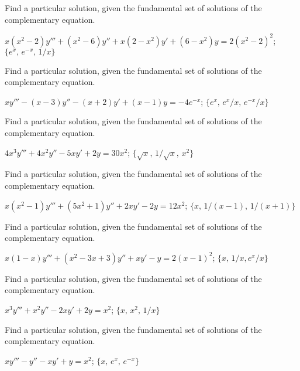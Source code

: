 \documentclass{ximera}
\begin{document}
\begin{problem}\label{exer:9.4.6}
Find a particular
solution, given the fundamental set of solutions of the complementary equation.

$x(x^2-2)y'''+(x^2-6)y''+x(2-x^2)y'+(6-x^2)y=2(x^2-2)^2$; \quad
 $\{e^x,\,e^{-x},\,1/x\}$
\end{problem}

\begin{problem}\label{exer:9.4.7}
Find a particular
solution, given the fundamental set of solutions of the complementary equation.

$xy'''-(x-3)y''-(x+2)y'+(x-1)y=-4e^{-x}$; \quad
$\{e^x,\,e^x/x,\,e^{-x}/x\}$
\end{problem}

\begin{problem}\label{exer:9.4.8}
Find a particular
solution, given the fundamental set of solutions of the complementary equation.

$4x^3y'''+4x^2y''-5xy'+2y=30x^2$; \quad  $\{\sqrt x,\,1/\sqrt x,\,x^2\}$
\end{problem}

\begin{problem}\label{exer:9.4.9}
Find a particular
solution, given the fundamental set of solutions of the complementary equation.

$x(x^2-1)y'''+(5x^2+1)y''+2xy'-2y=12x^2$; \quad
$\{x,\,1/(x-1),\,1/(x+1)\}$
\end{problem}

\begin{problem}\label{exer:9.4.10}
Find a particular
solution, given the fundamental set of solutions of the complementary equation.

$x(1-x)y'''+(x^2-3x+3)y''+xy'-y=2(x-1)^2$; \quad
$\{x,\,1/x,e^x/x\}$
\end{problem}

\begin{problem}\label{exer:9.4.11}
Find a particular
solution, given the fundamental set of solutions of the complementary equation.

$x^3y'''+x^2y''-2xy'+2y=x^2$;  \quad  $\{x,\,x^2,\,1/x\}$
\end{problem}

\begin{problem}\label{exer:9.4.12} 
Find a particular
solution, given the fundamental set of solutions of the complementary equation.

$xy'''-y''-xy'+y=x^2$; \quad
$\{x,\,e^x,\,e^{-x}\}$
\end{problem}
\end{document}
